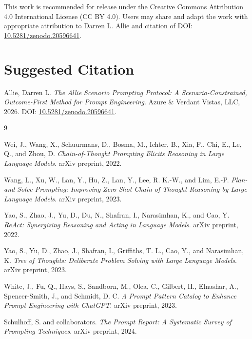 \documentclass[11pt]{article}
\begin{document}
This work is recommended for release under the Creative Commons Attribution 4.0 International License (CC BY 4.0). Users may share and adapt the work with appropriate attribution to Darren L. Allie and citation of DOI: \href{https://doi.org/10.5281/zenodo.20596641}{10.5281/zenodo.20596641}.

\section*{Suggested Citation}

Allie, Darren L. \textit{The Allie Scenario Prompting Protocol: A Scenario-Constrained, Outcome-First Method for Prompt Engineering}. Azure \& Verdant Vistas, LLC, 2026. DOI: \href{https://doi.org/10.5281/zenodo.20596641}{10.5281/zenodo.20596641}.

\begin{thebibliography}{9}

Wei, J., Wang, X., Schuurmans, D., Bosma, M., Ichter, B., Xia, F., Chi, E., Le, Q., and Zhou, D.
\textit{Chain-of-Thought Prompting Elicits Reasoning in Large Language Models}.
arXiv preprint, 2022.

Wang, L., Xu, W., Lan, Y., Hu, Z., Lan, Y., Lee, R. K.-W., and Lim, E.-P.
\textit{Plan-and-Solve Prompting: Improving Zero-Shot Chain-of-Thought Reasoning by Large Language Models}.
arXiv preprint, 2023.

Yao, S., Zhao, J., Yu, D., Du, N., Shafran, I., Narasimhan, K., and Cao, Y.
\textit{ReAct: Synergizing Reasoning and Acting in Language Models}.
arXiv preprint, 2022.

Yao, S., Yu, D., Zhao, J., Shafran, I., Griffiths, T. L., Cao, Y., and Narasimhan, K.
\textit{Tree of Thoughts: Deliberate Problem Solving with Large Language Models}.
arXiv preprint, 2023.

White, J., Fu, Q., Hays, S., Sandborn, M., Olea, C., Gilbert, H., Elnashar, A., Spencer-Smith, J., and Schmidt, D. C.
\textit{A Prompt Pattern Catalog to Enhance Prompt Engineering with ChatGPT}.
arXiv preprint, 2023.

Schulhoff, S. and collaborators.
\textit{The Prompt Report: A Systematic Survey of Prompting Techniques}.
arXiv preprint, 2024.

\end{thebibliography}
\end{document}

